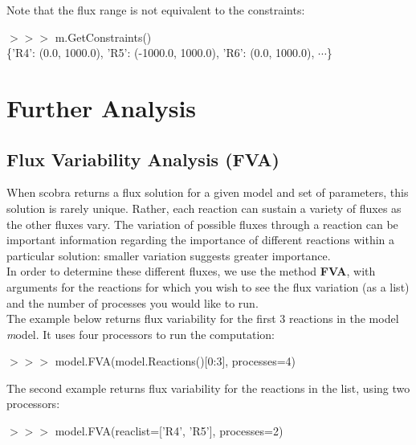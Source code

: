 Note that the flux range is not equivalent to the constraints:

\begin{framed}
$>>>$ m.GetConstraints()\\
\{'R4': (0.0, 1000.0), 'R5': (-1000.0, 1000.0), 'R6': (0.0, 1000.0), $\cdots$\}
\end{framed}


\section{Further Analysis}

\subsection{Flux Variability Analysis (FVA)}

When scobra returns a flux solution for a given model and set of parameters, this solution is rarely unique. Rather, each reaction can sustain a variety of fluxes as the other fluxes vary. The variation of possible fluxes through a reaction can be important information regarding the importance of different reactions within a particular solution: smaller variation suggests greater importance.\\

In order to determine these different fluxes, we use the method \textbf{FVA}, with arguments for the reactions for which you wish to see the flux variation (as a list) and the number of processes you would like to run.\\

The example below returns flux variability for the first 3 reactions in the model \textit model. It uses four processors to run the computation:

\begin{framed}
$>>>$ model.FVA(model.Reactions()[0:3], processes=4)
\end{framed}

The second example returns flux variability for the reactions in the list, using two processors:

\begin{framed}
$>>>$ model.FVA(reaclist=['R4', 'R5'], processes=2)
\end{framed}






